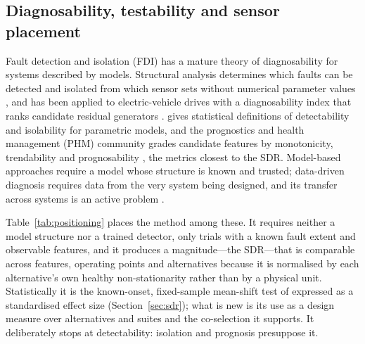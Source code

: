 \subsection{Diagnosability, testability and sensor placement}

Fault detection and isolation (FDI) has a mature theory of diagnosability for systems described by models. Structural analysis determines which faults can be detected and isolated from which sensor sets without numerical parameter values \citep{Blanke2016, Krysander2008}, and has been applied to electric-vehicle drives with a diagnosability index that ranks candidate residual generators \citep{Zhang2015}. \citet{Basseville2001} gives statistical definitions of detectability and isolability for parametric models, and the prognostics and health management (PHM) community grades candidate features by monotonicity, trendability and prognosability \citep{Coble2013}, the metrics closest to the SDR. Model-based approaches \citep{Venkatasubramanian2003} require a model whose structure is known and trusted; data-driven diagnosis \citep{Lei2020} requires data from the very system being designed, and its transfer across systems is an active problem \citep{Pan2010}.

Table~\ref{tab:positioning} places the method among these. It requires neither a model structure nor a trained detector, only trials with a known fault extent and observable features, and it produces a magnitude---the SDR---that is comparable across features, operating points and alternatives because it is normalised by each alternative's own healthy non-stationarity rather than by a physical unit. Statistically it is the known-onset, fixed-sample mean-shift test of \citet{Basseville1993} expressed as a standardised effect size (Section~\ref{sec:sdr}); what is new is its use as a design measure over alternatives and suites and the co-selection it supports. It deliberately stops at detectability: isolation and prognosis presuppose it.


